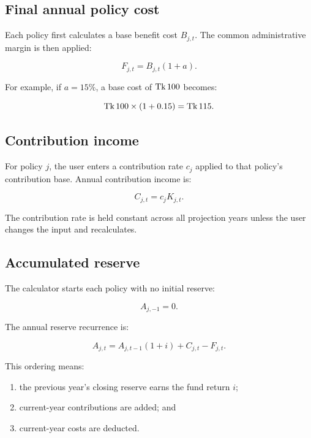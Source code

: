 \subsection{Final annual policy cost}

Each policy first calculates a base benefit cost $B_{j,t}$. The common administrative margin is then applied:

\begin{equation}
F_{j,t}=B_{j,t}(1+a).
\end{equation}

For example, if $a=15\%$, a base cost of $\text{Tk}\,100$ becomes:

\begin{equation}
\text{Tk}\,100\times(1+0.15)=\text{Tk}\,115.
\end{equation}

\subsection{Contribution income}

For policy $j$, the user enters a contribution rate $c_j$ applied to that policy's contribution base. Annual contribution income is:

\begin{equation}
C_{j,t}=c_jK_{j,t}.
\end{equation}

The contribution rate is held constant across all projection years unless the user changes the input and recalculates.

\subsection{Accumulated reserve}

The calculator starts each policy with no initial reserve:

\begin{equation}
A_{j,-1}=0.
\end{equation}

The annual reserve recurrence is:

\begin{equation}
A_{j,t}=A_{j,t-1}(1+i)+C_{j,t}-F_{j,t}.
\end{equation}

This ordering means:

\begin{enumerate}
  \item the previous year's closing reserve earns the fund return $i$;
  \item current-year contributions are added; and
  \item current-year costs are deducted.
\end{enumerate}


